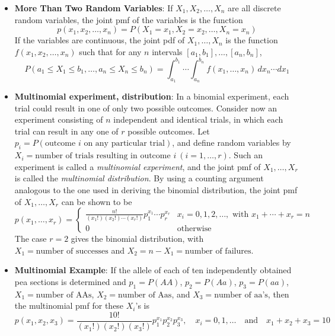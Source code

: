 \documentclass{report}
\begin{document}
\begin{itemize}
        \item \textbf{More Than Two Random Variables}:
            If \( X_1, X_2, \ldots, X_n \) are all discrete random variables, the joint pmf of the variables is the function
            \[
                p(x_1, x_2, \ldots, x_n) = P(X_1 = x_1, X_2 = x_2, \ldots, X_n = x_n)
            \]
            If the variables are continuous, the joint pdf of \( X_1, \ldots, X_n \) is the function \( f(x_1, x_2, \ldots, x_n) \) such that for any \( n \) intervals \([a_1, b_1], \ldots, [a_n, b_n]\),
            \[
                P(a_1 \leq X_1 \leq b_1, \ldots, a_n \leq X_n \leq b_n) = \int_{a_1}^{b_1} \cdots \int_{a_n}^{b_n} f(x_1, \ldots, x_n) \, dx_n \cdots dx_1
            \]
        \item \textbf{Multinomial experiment, distribution}:
            In a binomial experiment, each trial could result in one of only two possible outcomes. Consider now an experiment consisting of \( n \) independent and identical trials, in which each trial can result in any one of \( r \) possible outcomes. Let \( p_i = P(\text{outcome } i \text{ on any particular trial}) \), and define random variables by \( X_i = \text{number of trials resulting in outcome } i \ (i = 1, \ldots, r) \). Such an experiment is called a \textit{multinomial experiment}, and the joint pmf of \( X_1, \ldots, X_r \) is called the \textit{multinomial distribution}. By using a counting argument analogous to the one used in deriving the binomial distribution, the joint pmf of \( X_1, \ldots, X_r \) can be shown to be
            \[
                p(x_1, \ldots, x_r) = 
                \begin{cases} 
                    \frac{n!}{(x_1!)(x_2!) \cdots (x_r!)} p_1^{x_1} \cdots p_r^{x_r} & x_i = 0, 1, 2, \ldots, \text{ with } x_1 + \cdots + x_r = n \\
                    0 & \text{otherwise}
                \end{cases}
            \]
            The case \( r = 2 \) gives the binomial distribution, with \( X_1 = \text{number of successes} \) and \( X_2 = n - X_1 = \text{number of failures} \).
        \item \textbf{Multinomial Example}:
            If the allele of each of ten independently obtained pea sections is determined and \( p_1 = P(AA) \), \( p_2 = P(Aa) \), \( p_3 = P(aa) \), \( X_1 = \text{number of AAs} \), \( X_2 = \text{number of Aas} \), and \( X_3 = \text{number of aa's} \), then the multinomial pmf for these \( X_i \)'s is
            \[
                p(x_1, x_2, x_3) = \frac{10!}{(x_1!)(x_2!)(x_3!)} p_1^{x_1} p_2^{x_2} p_3^{x_3}, \quad x_i = 0, 1, \ldots \quad \text{and} \quad x_1 + x_2 + x_3 = 10
\]
\end{itemize}
\end{document}
